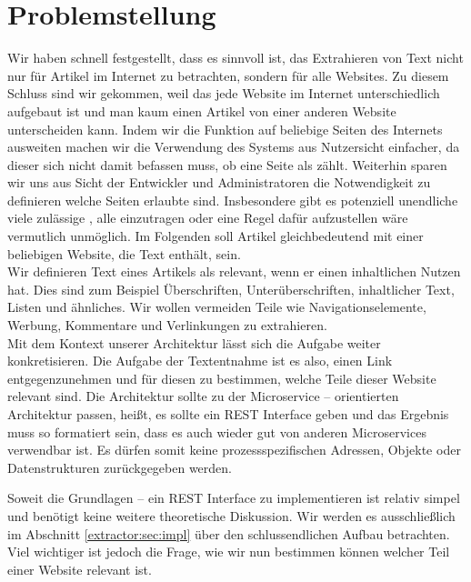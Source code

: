 \section{Problemstellung}
Wir haben schnell festgestellt, dass es sinnvoll ist, das Extrahieren von Text nicht nur für Artikel im Internet zu betrachten, sondern für alle Websites. Zu diesem Schluss sind wir gekommen, weil das jede Website im Internet unterschiedlich aufgebaut ist und man kaum einen Artikel von einer anderen Website unterscheiden kann. Indem wir die Funktion auf beliebige Seiten des Internets ausweiten machen wir die Verwendung des Systems aus Nutzersicht einfacher, da dieser sich nicht damit befassen muss, ob eine Seite als  zählt. Weiterhin sparen wir uns aus Sicht der Entwickler und Administratoren die Notwendigkeit zu definieren welche Seiten erlaubte  sind. Insbesondere gibt es potenziell unendliche viele zulässige , alle einzutragen oder eine Regel dafür aufzustellen wäre vermutlich unmöglich.
Im Folgenden soll Artikel gleichbedeutend mit einer beliebigen Website, die Text enthält, sein.\\
Wir definieren Text eines Artikels als relevant, wenn er einen inhaltlichen Nutzen hat. Dies sind zum Beispiel Überschriften, Unterüberschriften, inhaltlicher Text, Listen und ähnliches. Wir wollen vermeiden Teile wie Navigationselemente, Werbung, Kommentare und Verlinkungen zu extrahieren. \\
Mit dem Kontext unserer Architektur lässt sich die Aufgabe weiter konkretisieren. Die Aufgabe der Textentnahme ist es also, einen Link entgegenzunehmen und für diesen zu bestimmen, welche Teile dieser Website relevant sind. Die Architektur sollte zu der Microservice – orientierten Architektur passen, heißt, es sollte ein REST Interface geben und das Ergebnis muss so formatiert sein, dass es auch wieder gut von anderen Microservices verwendbar ist. Es dürfen somit keine prozessspezifischen Adressen, Objekte oder Datenstrukturen zurückgegeben werden. \\ \par
Soweit die Grundlagen – ein REST Interface zu implementieren ist relativ simpel und benötigt keine weitere theoretische Diskussion. Wir werden es ausschließlich im Abschnitt \ref{extractor:sec:impl} über den schlussendlichen Aufbau betrachten. Viel wichtiger ist jedoch die Frage, wie wir nun bestimmen können welcher Teil einer Website relevant ist. 

